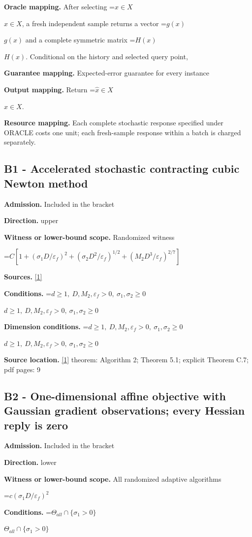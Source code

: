 \documentclass[10pt,a4paper]{article}
\newcommand{\AtlasMath}[1]{\par\begingroup\centering\setbox0=\hbox{$\displaystyle #1$}\ifdim\wd0>1.4\linewidth\typeout{ATLAS WIDE FORMULA: \the\wd0}\fi\ifdim\wd0>\linewidth\resizebox{\linewidth}{!}{\box0}\else\box0\fi\par\endgroup}
\newcommand{\AtlasInlineMath}[1]{\begingroup\setbox0=\hbox{$#1$}\ifdim\wd0>.4\linewidth\endgroup\AtlasMath{#1}\else\endgroup$#1$\fi}
\begin{document}
\textbf{Oracle mapping.} After selecting \AtlasInlineMath{x\in X}, a fresh independent sample returns a vector \AtlasInlineMath{g(x)} and a complete symmetric matrix \AtlasInlineMath{H(x)}. Conditional on the history and selected query point,

\textbf{Guarantee mapping.} Expected-error guarantee for every instance

\textbf{Output mapping.} Return \AtlasInlineMath{\widehat{x}\in X}.

\textbf{Resource mapping.} Each complete stochastic response specified under ORACLE costs one unit; each fresh-sample response within a batch is charged separately.

\subsection{B1 - Accelerated stochastic contracting cubic Newton method}
\textbf{Admission.} Included in the bracket

\textbf{Direction.} upper

\textbf{Witness or lower-bound scope.} Randomized witness

\AtlasMath{C[1+(\sigma_1D/\varepsilon_f)^2+(\sigma_2D^2/\varepsilon_f)^{1/2}+(M_2D^3/\varepsilon_f)^{2/7}]}
\textbf{Sources.} \href{https://arxiv.org/pdf/2610.11693v2}{[1]}

\textbf{Conditions.} \AtlasInlineMath{d\ge1,\ D,M_2,\varepsilon_f>0,\ \sigma_1,\sigma_2\ge0}

\textbf{Dimension conditions.} \AtlasInlineMath{d\ge1,\ D,M_2,\varepsilon_f>0,\ \sigma_1,\sigma_2\ge0}

\textbf{Source location.} \href{https://arxiv.org/pdf/2610.11693v2}{[1]} theorem: Algorithm 2; Theorem 5.1; explicit Theorem C.7; pdf pages: 9

\subsection{B2 - One-dimensional affine objective with Gaussian gradient observations; every Hessian reply is zero}
\textbf{Admission.} Included in the bracket

\textbf{Direction.} lower

\textbf{Witness or lower-bound scope.} All randomized adaptive algorithms

\AtlasMath{c(\sigma_1D/\varepsilon_f)^2}
\textbf{Conditions.} \AtlasInlineMath{\Theta_{all}\cap\{\sigma_1>0\}}
\end{document}
